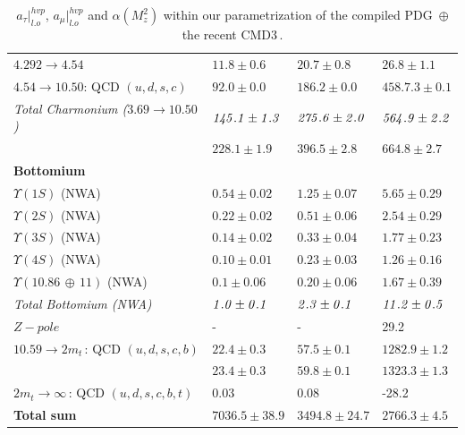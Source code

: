 \documentclass[review]{elsarticle}
\begin{document}
{\begin{table}[H]
\begin{center}
{\begin{tabular}{| llll |}
$4.292\to4.54$ & $11.8\pm 0.6$&$20.7\pm 0.8$&$26.8\pm 1.1$\\
$4.54\to10.50$:  QCD $(u,d,s,c)$ & $92.0\pm 0.0$&$186.2\pm 0.0$&$458.7.3\pm 0.1$\\
{\it Total Charmonium ($3.69\to 10.50$)}&$\it 145.1\pm 1.3$&$\it 275.6\pm 2.0$&$\it 564.9\pm 2.2$\\
\rowcolor{greenli}{ Total Charmonium }&$ 228.1\pm 1.9$&$396.5\pm 2.8$&$664.8\pm 2.7$\\
 {\bf Bottomium} &&&\\
$\Upsilon (1S)$ (NWA) &$0.54\pm 0.02$&$1.25\pm 0.07$&$5.65\pm 0.29$\\
$\Upsilon(2S)$ (NWA) &$0.22\pm 0.02$&$0.51\pm 0.06$&$2.54\pm 0.29$\\
$\Upsilon (3S)$ (NWA) &$0.14\pm 0.02$&$0.33\pm 0.04$&$1.77\pm 0.23$\\
$\Upsilon(4S)$ (NWA) &$0.10\pm 0.01$&$0.23\pm 0.03$&$1.26\pm 0.16$\\
$\Upsilon(10.86\,\oplus\,11)$ (NWA) &$0.1\pm 0.06$&$0.20\pm 0.06$&$1.67\pm 0.39$\\
{\it Total Bottomium (NWA)}&$\it1.0\pm 0.1$&$\it 2.3\pm 0.1$&$\it 11.2\pm 0.5$ \\
$Z-pole $&-&-&29.2\,\cite{YND17}\\
$10.59\to2m_t$\,:  QCD $(u,d,s,c,b)$ & $22.4\pm 0.3$&$57.5\pm 0.1$&$1282.9\pm 1.2$\\
\rowcolor{greenli}{Total Bottomium }&$ 23.4\pm 0.3$&$59.8\pm 0.1$&$1323.3\pm1.3$\\
$2m_t\to\infty$\,: QCD $(u,d,s,c,b,t)$&0.03&0.08&-28.2\\
\hline
\rowcolor{yellow}\bf Total sum &\boldmath$7036.5\pm 38.9$&\boldmath$3494.8\pm 24.7$&\boldmath$2766.3\pm 4.5$\\

   \hline\hline
 
\end{tabular}}
 \caption{ %
  $a_\tau\vert^{hvp}_{l.o}$, $a_\mu\vert^{hvp}_{l.o}$ and $\alpha(M^2_z)$ within our parametrization of the compiled PDG\,\cite{PDG} $\oplus$ the recent CMD3\,\cite{CMD3}. }\label{tab:amu1} 
 \end{center}
\end{table}
} 
\end{document}
